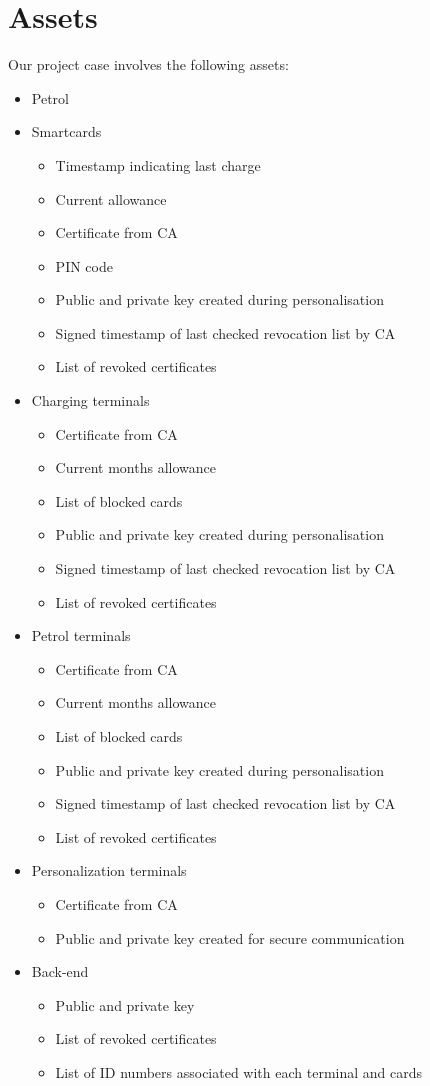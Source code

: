 \section*{Assets}
Our project case involves the following assets:
\begin{itemize}
\item Petrol

\item Smartcards
\begin{itemize}
 \item Timestamp indicating last charge
 \item Current allowance
 \item Certificate from CA
 \item PIN code
 \item Public and private key created during personalisation
 \item Signed timestamp of last checked revocation list by CA
 \item List of revoked certificates
\end{itemize}

 \item Charging terminals
 \begin{itemize}
 	\item Certificate from CA
 	\item Current months allowance
 	\item List of blocked cards
 	\item Public and private key created during personalisation
 	\item Signed timestamp of last checked revocation list by CA
 	\item List of revoked certificates
 \end{itemize}

 
 \item Petrol terminals
 \begin{itemize}
  	\item Certificate from CA
 	\item Current months allowance
 	\item List of blocked cards
 	\item Public and private key created during personalisation
 	\item Signed timestamp of last checked revocation list by CA
 	\item List of revoked certificates
 \end{itemize}

 
 \item Personalization terminals
 \begin{itemize}
	\item Certificate from CA
	\item Public and private key created for secure communication
 \end{itemize}

 
 \item Back-end
 \begin{itemize}
 	\item Public and private key
 	\item List of revoked certificates
 	\item List of ID numbers associated with each terminal and cards
 \end{itemize}

\end{itemize}
